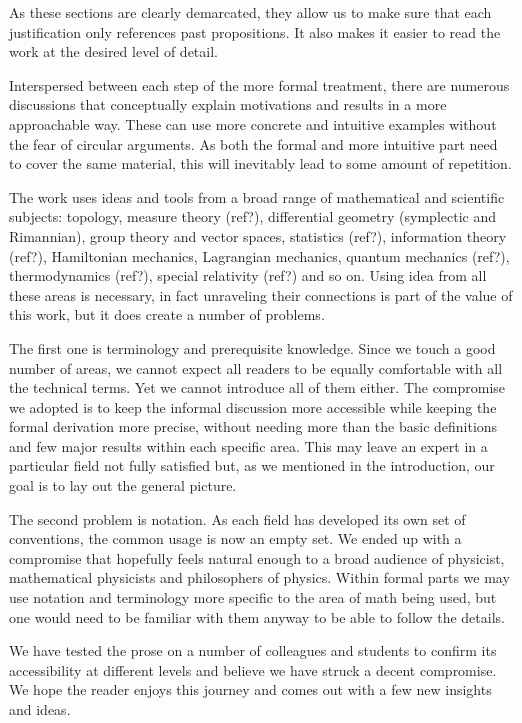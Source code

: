 \documentclass[aps,pra,10pt,twocolumn,floatfix,nofootinbib]{revtex4-1}
\numberwithin{equation}{section}
\theoremstyle{definition}
\begin{document}
As these sections are clearly demarcated, they allow us to make sure that each justification only references past propositions. It also makes it easier to read the work at the desired level of detail.

Interspersed between each step of the more formal treatment, there are numerous discussions that conceptually explain motivations and results in a more approachable way. These can use more concrete and intuitive examples without the fear of circular arguments. As both the formal and more intuitive part need to cover the same material, this will inevitably lead to some amount of repetition.

The work uses ideas and tools from a broad range of mathematical and scientific subjects: topology\cite{LeeTM}, measure theory (ref?), differential geometry (symplectic and Rimannian)\cite{Lee}, group theory and vector spaces\cite{Lang,Young}, statistics (ref?), information theory (ref?), Hamiltonian mechanics, Lagrangian mechanics\cite{classical_dynamics}, quantum mechanics (ref?), thermodynamics (ref?), special relativity (ref?) and so on. Using idea from all these areas is necessary, in fact unraveling their connections is part of the value of this work, but it does create a number of problems.

The first one is terminology and prerequisite knowledge. Since we touch a good number of areas, we cannot expect all readers to be equally comfortable with all the technical terms. Yet we cannot introduce all of them either. The compromise we adopted is to keep the informal discussion more accessible while keeping the formal derivation more precise, without needing more than the basic definitions and few major results within each specific area. This may leave an expert in a particular field not fully satisfied but, as we mentioned in the introduction, our goal is to lay out the general picture.

The second problem is notation. As each field has developed its own set of conventions, the common usage is now an empty set. We ended up with a compromise that hopefully feels natural enough to a broad audience of physicist, mathematical physicists and philosophers of physics. Within formal parts we may use notation and terminology more specific to the area of math being used, but one would need to be familiar with them anyway to be able to follow the details.

We have tested the prose on a number of colleagues and students to confirm its accessibility at different levels and believe we have struck a decent compromise. We hope the reader enjoys this journey and comes out with a few new insights and ideas.
\end{document}
